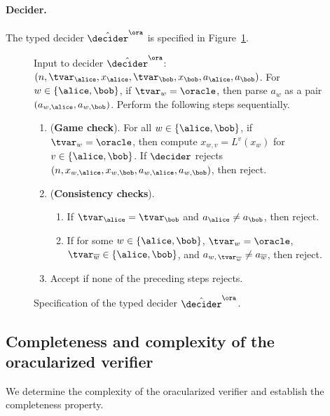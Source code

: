 \paragraph{Decider.}
The typed decider $\tdora$ is specified in Figure~\ref{fig:oracle-decider}.

\begin{figure}[!htb]
  \centering
  \begin{gamespec}
    Input to decider $\tdora$: $(n, \tvar_\alice, x_\alice , \tvar_\bob,
    x_\bob ,a_\alice, a_\bob)$.
    For $w \in \{\alice,\bob\}$, if $\tvar_w = \oracle$, then parse $a_w$ as a
    pair $(a_{w, \alice}, a_{w, \bob})$.
    Perform the following steps sequentially.

    \begin{enumerate}
    \item (\textbf{Game check}).
      \label{enu:oracle-game}
      For all $w \in \{\alice,\bob\}$, if $\tvar_w = \oracle$, then compute
      $x_{w,v} = L^v(x_w)$ for $v \in \{\alice,\bob\}$.
      If $\decider$ rejects $(n,
      x_{w,\alice},x_{w,\bob},a_{w,\alice},a_{w,\bob})$, then reject.

    \item (\textbf{Consistency checks}).
      \label{enu:oracle-full-consistency}
      \begin{enumerate}[nosep]
      \item \label{enu:check-same} If $\tvar_\alice = \tvar_\bob$ and $a_\alice
        \neq a_\bob$, then reject.
      \item \label{enu:oracle-versus-player} If for some $w \in
        \{\alice,\bob\}$, $\tvar_w = \oracle$, $\tvar_{\overline{w}} \in
        \{\alice,\bob\}$, and $a_{w,\, \tvar_{\overline{w}}} \neq
        a_{\overline{w}}$, then reject.
      \end{enumerate}
    \item \label{enu:oracle-acc} Accept if none of the preceding steps rejects.
    \end{enumerate}
  \end{gamespec}
  \caption{Specification of the typed decider $\tdora$.}
  \label{fig:oracle-decider}
\end{figure}

\subsection{Completeness and complexity of the oracularized verifier}

We determine the complexity of the oracularized verifier and
establish the completeness property.

